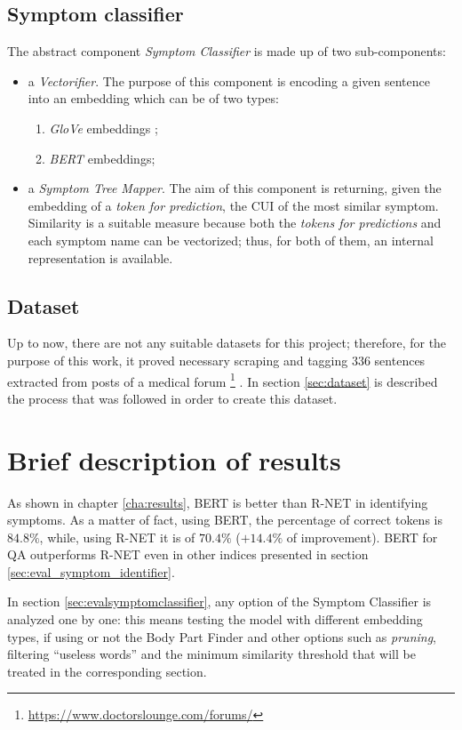 \subsection*{Symptom classifier}
The abstract component \textit{Symptom Classifier} is made up of two sub-components:
\begin{itemize}
  \item a \textit{Vectorifier}. The purpose of this component is encoding a given sentence into an embedding which can be of two types:
  \begin{enumerate}
    \item \textit{GloVe} embeddings \cite{glove};
    \item \textit{BERT} embeddings;
  \end{enumerate}
  \item a \textit{Symptom Tree Mapper}. The aim of this component is returning, given the embedding of a \textit{token for prediction}, the CUI of the most similar symptom. Similarity is a suitable measure because both the \textit{tokens for predictions} and each symptom name can be vectorized; thus, for both of them, an internal representation is available.
\end{itemize}

\subsection*{Dataset}
\label{datasetintro}
Up to now, there are not any suitable datasets for this project; therefore, for the purpose of this work, it proved necessary scraping and tagging $336$ sentences extracted from posts of a medical forum \footnote{\url{https://www.doctorslounge.com/forums/}} \cite{doctorslounge}. In section \ref{sec:dataset} is described the process that was followed in order to create this dataset.

\section{Brief description of results}
\label{sec:brief_results}
As shown in chapter \ref{cha:results}, BERT is better than R-NET in identifying symptoms. As a matter of fact, using BERT, the percentage of correct tokens is $84.8 \%$, while, using R-NET it is of $70.4 \%$ ($+ 14.4 \%$ of improvement). BERT for QA outperforms R-NET even in other indices presented in section \ref{sec:eval_symptom_identifier}.

In section \ref{sec:evalsymptomclassifier}, any option of the Symptom Classifier is analyzed one by one: this means testing the model with different embedding types, if using or not the Body Part Finder and other options such as \textit{pruning}, filtering ``useless words'' and the minimum similarity threshold that will be treated in the corresponding section.
